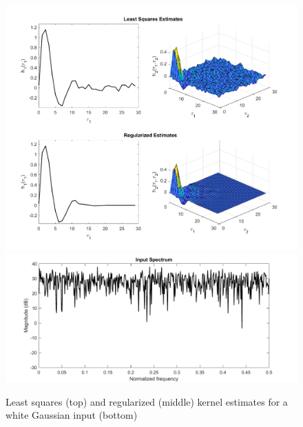 \begin{figure}[!hp]
\centering
\includegraphics[width = 1.1\textwidth]{Chapter3_VolterraSeries/LSvsReLS_whiteinput.pdf}
\includegraphics[width = 1.1\textwidth]{Chapter3_VolterraSeries/white_spectrum.pdf}
\caption{Least squares (top) and regularized (middle) kernel estimates for a white Gaussian input (bottom)}
\label{fig:ExampleLSvsReLS_VolterraSeries2_whitenoise}
\end{figure}

